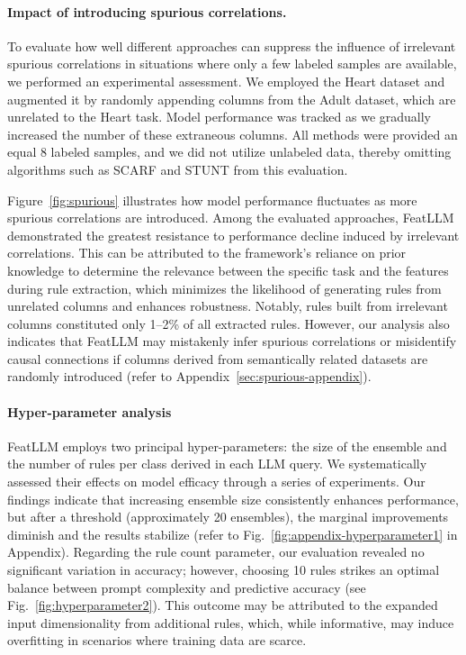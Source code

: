 \vspace*{-0.12in}
\paragraph{Impact of introducing spurious correlations.} To evaluate how well different approaches can suppress the influence of irrelevant spurious correlations in situations where only a few labeled samples are available, we performed an experimental assessment. We employed the Heart dataset and augmented it by randomly appending columns from the Adult dataset, which are unrelated to the Heart task. Model performance was tracked as we gradually increased the number of these extraneous columns. All methods were provided an equal 8 labeled samples, and we did not utilize unlabeled data, thereby omitting algorithms such as SCARF and STUNT from this evaluation.

Figure~\ref{fig:spurious} illustrates how model performance fluctuates as more spurious correlations are introduced. Among the evaluated approaches, \textsf{FeatLLM} demonstrated the greatest resistance to performance decline induced by irrelevant correlations. This can be attributed to the framework’s reliance on prior knowledge to determine the relevance between the specific task and the features during rule extraction, which minimizes the likelihood of generating rules from unrelated columns and enhances robustness. Notably, rules built from irrelevant columns constituted only 1–2\% of all extracted rules. However, our analysis also indicates that \textsf{FeatLLM} may mistakenly infer spurious correlations or misidentify causal connections if columns derived from semantically related datasets are randomly introduced (refer to Appendix~\ref{sec:spurious-appendix}).

\vspace*{-0.12in}
\paragraph{Hyper-parameter analysis}
\textsf{FeatLLM} employs two principal hyper-parameters: the size of the ensemble and the number of rules per class derived in each LLM query. We systematically assessed their effects on model efficacy through a series of experiments. Our findings indicate that increasing ensemble size consistently enhances performance, but after a threshold (approximately 20 ensembles), the marginal improvements diminish and the results stabilize (refer to Fig.~\ref{fig:appendix-hyperparameter1} in Appendix). Regarding the rule count parameter, our evaluation revealed no significant variation in accuracy; however, choosing 10 rules strikes an optimal balance between prompt complexity and predictive accuracy (see Fig.~\ref{fig:hyperparameter2}). This outcome may be attributed to the expanded input dimensionality from additional rules, which, while informative, may induce overfitting in scenarios where training data are scarce.

